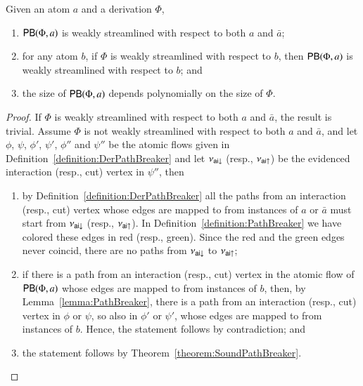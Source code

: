 \begin{proposition}\label{proposition:PathBreaker}
Given an atom $a$ and a derivation $\Phi$,
\begin{enumerate}
\item $\mathsf{PB}(\Phi,a)$ is weakly streamlined with respect to both $a$ and $\bar a$;
\item for any atom $b$, if $\Phi$ is weakly streamlined with respect to $b$, then $\mathsf{PB}(\Phi,a)$ is weakly streamlined with respect to $b$; and
\item the size of\/ $\mathsf{PB}(\Phi,a)$ depends polynomially on the size of\/ $\Phi$.
\end{enumerate}
\end{proposition}

\begin{proof}
If $\Phi$ is weakly streamlined with respect to both $a$ and $\bar a$, the result is trivial. Assume $\Phi$ is not weakly streamlined with respect to both $a$ and $\bar a$, and let $\phi$, $\psi$, $\phi'$, $\psi'$, $\phi''$ and $\psi''$ be the atomic flows given in Definition~\ref{definition:DerPathBreaker} and let $\nu_{{\mathsf{ai}}{\downarrow}}$ (resp., $\nu_{{\mathsf{ai}}{\uparrow}}$) be the evidenced interaction (resp., cut) vertex in $\psi''$, then
\begin{enumerate}
\item by Definition~\ref{definition:DerPathBreaker} all the paths from an interaction (resp., cut) vertex whose edges are mapped to from instances of $a$ or $\bar a$ must start from $\nu_{{\mathsf{ai}}{\downarrow}}$ (resp., $\nu_{{\mathsf{ai}}{\uparrow}}$). In Definition~\ref{definition:PathBreaker} we have colored these edges in red (resp., green). Since the red and the green edges never coincid, there are no paths from $\nu_{{\mathsf{ai}}{\downarrow}}$ to $\nu_{{\mathsf{ai}}{\uparrow}}$;
\item if there is a path from an interaction (resp., cut) vertex in the atomic flow of $\mathsf{PB}(\Phi,a)$ whose edges are mapped to from instances of $b$, then, by Lemma~\vref{lemma:PathBreaker}, there is a path from an interaction (resp., cut) vertex in $\phi$ or $\psi$, so also in $\phi'$ or $\psi'$, whose edges are mapped to from instances of $b$. Hence, the statement follows by contradiction; and
\item the statement follows by Theorem~\vref{theorem:SoundPathBreaker}.
\end{enumerate}
\end{proof}

